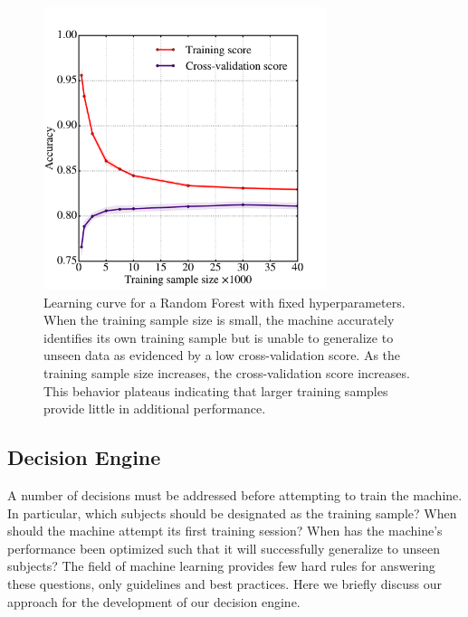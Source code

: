 \documentclass[twocolumn]{aastex6}%
\begin{document}
\begin{figure}[t!]
\includegraphics[width=3.25in]{f6.pdf}
\caption{Learning curve for a Random Forest with fixed hyperparameters.  When the training sample size is small, the machine accurately identifies its own training sample but is unable to generalize to unseen data as evidenced by a low cross-validation score. As the training sample size increases, the cross-validation score increases. This behavior plateaus indicating that larger training samples provide little in additional performance. \label{fig: learning curve}}
\end{figure}


\subsection{Decision Engine}\label{sec: decision engine}
A number of decisions must be addressed before attempting to train the machine. 
In particular, which subjects should be designated as the training sample? 
When should the machine attempt its first training session? 
When has the machine's performance been optimized such that it will successfully
generalize to unseen subjects? The field of machine learning provides few hard rules 
for answering these questions, only guidelines and best practices. 
Here we briefly discuss our approach for the development of our decision engine.
\end{document}
